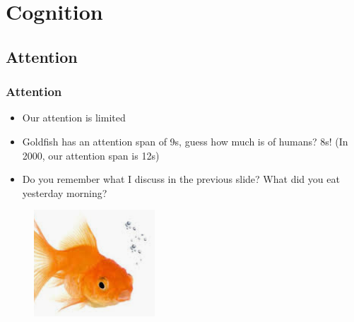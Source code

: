 \documentclass{beamer}
\begin{document}

		
		


\section{Cognition}
	
\subsection{Attention}

\begin{frame}
\frametitle{Attention}
\begin{itemize}
\item Our attention is limited
\item Goldfish has an attention span of 9s, guess how much is of humans? 8s!  (In 2000, our attention span is 12s)
\item Do you remember what I discuss in the previous slide?  What did you eat yesterday morning?
\end{itemize}
	\begin{figure}
	\includegraphics[width=0.3\linewidth]{image/goldfish}
\end{figure}
\end{frame}
\end{document}
